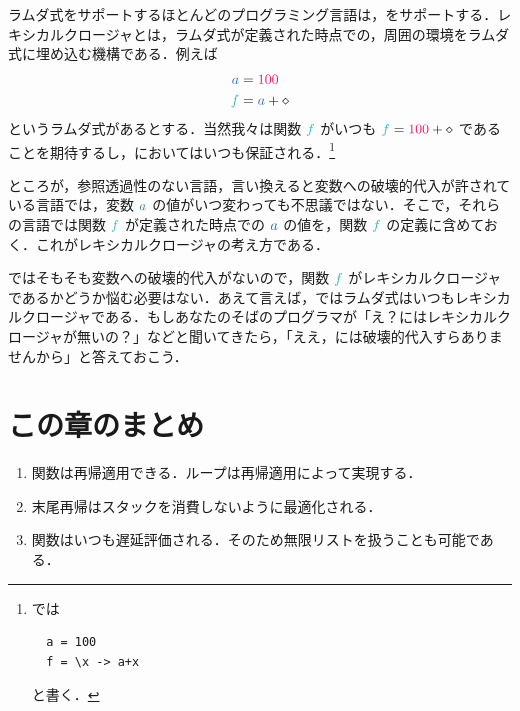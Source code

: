 \documentclass[a5paper,twoside,fleqn,draft]{jsbook}
\begin{document}
ラムダ式をサポートするほとんどのプログラミング言語は，をサポートする．レキシカルクロージャとは，ラムダ式が定義された時点での，周囲の環境をラムダ式に埋め込む機構である．例えば
\begin{align}
  \hVar{a}
  &=\hConstant{100}\\
  \hFunc{f}
  &=\hVar{a}+\hAnonParam
\end{align}
というラムダ式があるとする．当然我々は関数 $\hFunc{f}$ がいつも $\hFunc{f}=\hConstant{100}+\hAnonParam$ であることを期待するし，\haskell においてはいつも保証される．\footnote{\haskell では
\begin{verbatim}
  a = 100
  f = \x -> a+x
\end{verbatim}
と書く．}

ところが，参照透過性のない言語，言い換えると変数への破壊的代入が許されている言語では，変数 $\hVar{a}$ の値がいつ変わっても不思議ではない．そこで，それらの言語では関数 $\hFunc{f}$ が定義された時点での $\hVar{a}$ の値を，関数 $\hFunc{f}$ の定義に含めておく．これがレキシカルクロージャの考え方である．

\haskell ではそもそも変数への破壊的代入がないので，関数 $\hFunc{f}$ がレキシカルクロージャであるかどうか悩む必要はない．あえて言えば，\haskell ではラムダ式はいつもレキシカルクロージャである．もしあなたのそばの\cxx プログラマが「え？\haskell にはレキシカルクロージャが無いの？」などと聞いてきたら，「ええ，\haskell には破壊的代入すらありませんから」と答えておこう．

\section{この章のまとめ}

\begin{enumerate}
\item 関数は再帰適用できる．ループは再帰適用によって実現する．
\item 末尾再帰はスタックを消費しないように最適化される．
\item 関数はいつも遅延評価される．そのため無限リストを扱うことも可能である．
\end{enumerate}
\end{document}
